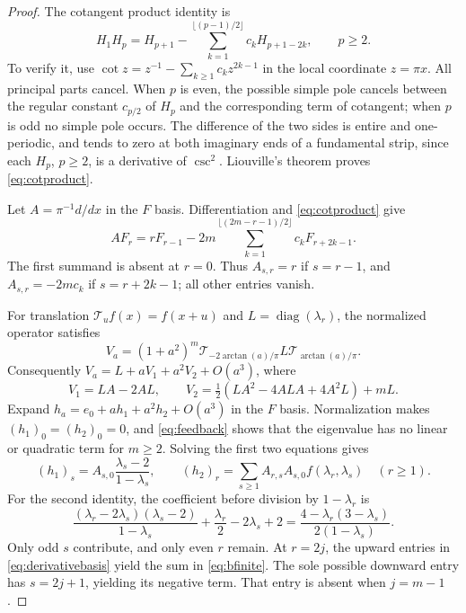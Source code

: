 \documentclass[11pt,a4paper]{article}
\theoremstyle{remark}\newtheorem*{ednote}{Editorial note (ProveIt, 2026-10-01)}
\begin{document}
\begin{proof}
The cotangent product identity is
\begin{equation}\label{eq:cotproduct}
 H_1H_p=H_{p+1}-\sum_{k=1}^{\lfloor(p-1)/2\rfloor}c_kH_{p+1-2k},
 \qquad p\ge2.
\end{equation}
To verify it, use $\cot z=z^{-1}-\sum_{k\ge1}c_kz^{2k-1}$ in the local coordinate $z=\pi x$. All principal parts cancel. When $p$ is even, the possible simple pole cancels between the regular constant $c_{p/2}$ of $H_p$ and the corresponding term of cotangent; when $p$ is odd no simple pole occurs. The difference of the two sides is entire and one-periodic, and tends to zero at both imaginary ends of a fundamental strip, since each $H_p$, $p\ge2$, is a derivative of $\csc^2$. Liouville's theorem proves \eqref{eq:cotproduct}.

Let $A=\pi^{-1}d/dx$ in the $F$ basis. Differentiation and \eqref{eq:cotproduct} give
\begin{equation}\label{eq:derivativebasis}
 AF_r=rF_{r-1}-2m\sum_{k=1}^{\lfloor(2m-r-1)/2\rfloor}
                         c_kF_{r+2k-1}.
\end{equation}
The first summand is absent at $r=0$. Thus $A_{s,r}=r$ if $s=r-1$, and $A_{s,r}=-2mc_k$ if $s=r+2k-1$; all other entries vanish.

For translation $\mathcal T_uf(x)=f(x+u)$ and $L=\operatorname{diag}(\lambda_r)$, the normalized operator satisfies
\[
 V_a=(1+a^2)^m\mathcal T_{-2\arctan(a)/\pi}
                    L\mathcal T_{\arctan(a)/\pi}.
\]
Consequently $V_a=L+aV_1+a^2V_2+O(a^3)$, where
\[
 V_1=LA-2AL,\qquad
 V_2=\tfrac12(LA^2-4ALA+4A^2L)+mL.
\]
Expand $h_a=e_0+ah_1+a^2h_2+O(a^3)$ in the $F$ basis. Normalization makes $(h_1)_0=(h_2)_0=0$, and \eqref{eq:feedback} shows that the eigenvalue has no linear or quadratic term for $m\ge2$. Solving the first two equations gives
\[
 (h_1)_s=A_{s,0}\frac{\lambda_s-2}{1-\lambda_s},\qquad
 (h_2)_r=\sum_{s\ge1}A_{r,s}A_{s,0}f(\lambda_r,\lambda_s)
 \quad(r\ge1).
\]
For the second identity, the coefficient before division by $1-\lambda_r$ is
\[
 \frac{(\lambda_r-2\lambda_s)(\lambda_s-2)}{1-\lambda_s}
       +\frac{\lambda_r}{2}-2\lambda_s+2
 =\frac{4-\lambda_r(3-\lambda_s)}{2(1-\lambda_s)}.
\]
Only odd $s$ contribute, and only even $r$ remain. At $r=2j$, the upward entries in \eqref{eq:derivativebasis} yield the sum in \eqref{eq:bfinite}. The sole possible downward entry has $s=2j+1$, yielding its negative term. That entry is absent when $j=m-1$.


\end{proof}
\end{document}
